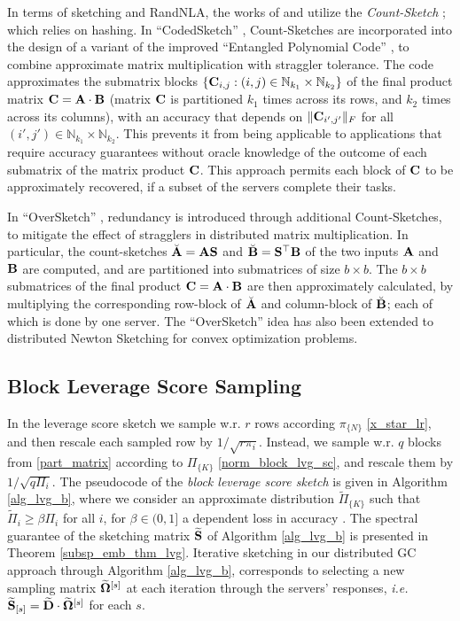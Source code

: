 \documentclass[journal,letterpaper,onecolumn,twoside,nofonttune]{IEEEtran}
\newcommand{\N}{\mathbb{N}}
\newcommand{\Ab}{\bold{A}}
\newcommand{\Bb}{\bold{B}}
\newcommand{\Cb}{\bold{C}}
\newcommand{\Db}{\bold{D}}
\newcommand{\Dbwt}{\widetilde{\Db}}
\newcommand{\Sb}{\bold{S}}
\newcommand{\Sbwt}{\widetilde{\Sb}}
\newcommand{\Omb}{\bold{\Omega}}
\newcommand{\Ombwt}{\widetilde{\Omb}}
\newcommand{\Pit}{\tilde{\Pi}}
\begin{document}
In terms of sketching and RandNLA, the works of \cite{JM19} and \cite{GWCR18} utilize the \textit{Count-Sketch} \cite{CCFC04}; which relies on hashing. In ``CodedSketch'' \cite{JM19}, Count-Sketches are incorporated into the design of a variant of the improved ``Entangled Polynomial Code'' \cite{YMAA20}, to combine approximate matrix multiplication with straggler tolerance. 
The code approximates the submatrix blocks $\{\Cb_{i,j}:(i,j)\in\N_{k_1}\times\N_{k_2}\}$ of the final product matrix $\Cb=\Ab\cdot\Bb$ (matrix $\Cb$ is partitioned $k_1$ times across its rows, and $k_2$ times across its columns), with an accuracy that depends on $\|\Cb_{i',j'}\|_F$ for all $(i',j')\in\N_{k_1}\times\N_{k_2}$. This prevents it from being applicable to applications that require accuracy guarantees without oracle knowledge of the outcome of each submatrix of the matrix product $\Cb$. This approach permits each block of $\Cb$ to be approximately recovered, if a subset of the servers complete their tasks.

In ``OverSketch'' \cite{GWCR18}, redundancy is introduced through additional Count-Sketches, to mitigate the effect of stragglers in distributed matrix multiplication. In particular, the count-sketches $\breve{\Ab}=\Ab\Sb$ and $\breve{\Bb}=\Sb^\top\Bb$ of the two inputs $\Ab$ and $\Bb$ are computed, and are partitioned into submatrices of size $b\times b$. The $b\times b$ submatrices of the final product $\Cb=\Ab\cdot\Bb$ are then approximately calculated, by multiplying the corresponding row-block of $\breve{\Ab}$ and column-block of $\breve{\Bb}$; each of which is done by one server. The ``OverSketch'' idea has also been extended to distributed Newton Sketching \cite{GKCMR20} for convex optimization problems.

\subsection{Block Leverage Score Sampling}
\label{lvg_sec}

In the leverage score sketch \cite{DMMW12,ERNM22,MMY15,Mah16,Woo14} we sample w.r. $r$ rows according $\pi_{\{N\}}$ \eqref{x_star_lr}, and then rescale each sampled row by $1/\sqrt{r\pi_i}$. Instead, we sample w.r. $q$ blocks from \eqref{part_matrix} according to $\Pi_{\{K\}}$ \eqref{norm_block_lvg_sc}, and rescale them by $1/\sqrt{q\Pi_i}$. The pseudocode of the \textit{block leverage score sketch} is given in Algorithm \ref{alg_lvg_b}, where we consider an approximate distribution $\Pit_{\{K\}}$ such that $\Pit_i\geqslant \beta\Pi_i$ for all $i$, for $\beta\in(0,1]$ a dependent loss in accuracy \cite{DMMW12,DMM06,Mah16}. The spectral guarantee of the sketching matrix $\Sbwt$ of Algorithm \ref{alg_lvg_b} is presented in Theorem \ref{subsp_emb_thm_lvg}. Iterative sketching in our distributed GC approach through Algorithm \ref{alg_lvg_b}, corresponds to selecting a new sampling matrix $\Ombwt^{[s]}$ at each iteration through the servers' responses, \textit{i.e.} $\Sbwt_{[s]}=\Dbwt\cdot\Ombwt^{[s]}$ for each $s$.
\end{document}

